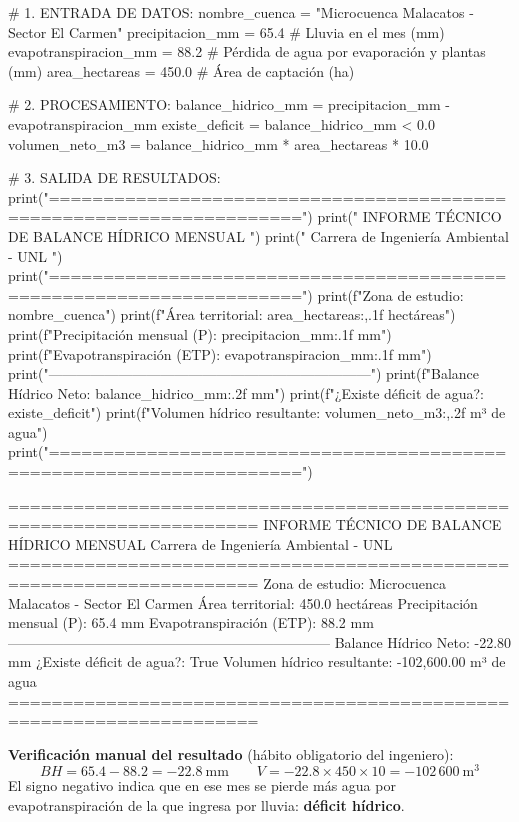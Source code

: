 \documentclass[11pt,a4paper]{article}
\begin{document}
\begin{codigo}
# 1. ENTRADA DE DATOS:
nombre_cuenca = "Microcuenca Malacatos - Sector El Carmen"
precipitacion_mm = 65.4       # Lluvia en el mes (mm)
evapotranspiracion_mm = 88.2  # Pérdida de agua por evaporación y plantas (mm)
area_hectareas = 450.0        # Área de captación (ha)

# 2. PROCESAMIENTO:
balance_hidrico_mm = precipitacion_mm - evapotranspiracion_mm
existe_deficit = balance_hidrico_mm < 0.0
volumen_neto_m3 = balance_hidrico_mm * area_hectareas * 10.0

# 3. SALIDA DE RESULTADOS:
print("=====================================================================")
print("          INFORME TÉCNICO DE BALANCE HÍDRICO MENSUAL                 ")
print("               Carrera de Ingeniería Ambiental - UNL                ")
print("=====================================================================")
print(f"Zona de estudio:             {nombre_cuenca}")
print(f"Área territorial:            {area_hectareas:,.1f} hectáreas")
print(f"Precipitación mensual (P):   {precipitacion_mm:.1f} mm")
print(f"Evapotranspiración (ETP):    {evapotranspiracion_mm:.1f} mm")
print("---------------------------------------------------------------------")
print(f"Balance Hídrico Neto:        {balance_hidrico_mm:.2f} mm")
print(f"¿Existe déficit de agua?:    {existe_deficit}")
print(f"Volumen hídrico resultante:  {volumen_neto_m3:,.2f} m³ de agua")
print("=====================================================================")
\end{codigo}
\begin{salida}
=====================================================================
          INFORME TÉCNICO DE BALANCE HÍDRICO MENSUAL
               Carrera de Ingeniería Ambiental - UNL
=====================================================================
Zona de estudio:             Microcuenca Malacatos - Sector El Carmen
Área territorial:            450.0 hectáreas
Precipitación mensual (P):   65.4 mm
Evapotranspiración (ETP):    88.2 mm
---------------------------------------------------------------------
Balance Hídrico Neto:        -22.80 mm
¿Existe déficit de agua?:    True
Volumen hídrico resultante:  -102,600.00 m³ de agua
=====================================================================
\end{salida}

\textbf{Verificación manual del resultado} (hábito obligatorio del ingeniero):
\[
BH = 65.4 - 88.2 = -22.8\ \text{mm} \qquad
V = -22.8 \times 450 \times 10 = -102\,600\ \text{m}^3
\]
El signo negativo indica que en ese mes se pierde más agua por evapotranspiración de la que ingresa por lluvia: \textbf{déficit hídrico}.
\end{document}
